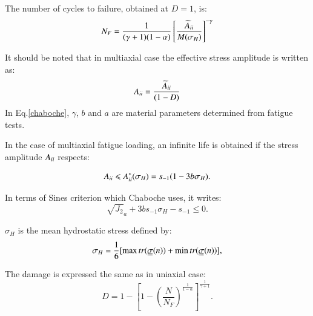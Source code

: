 \documentclass[3p,times,procedia,number]{elsarticle}
\begin{document}
The number of cycles to failure, obtained at $D=1$, is: 
\begin{equation}N_F = \frac{1}{(\gamma+1)(1-\alpha)}\left[\frac{\widetilde{A}_{\uppercase\expandafter{\romannumeral2}}}{M(\sigma_H)}\right]^{-\gamma}
\label{chaboche}
\end{equation} 

It should be noted that in multiaxial case the effective stress amplitude is written as:
$$A_{\uppercase\expandafter{\romannumeral2}}=\frac{\widetilde{A}_{\uppercase\expandafter{\romannumeral2}}}{(1-D)}$$
In Eq.\eqref{chaboche}, $\gamma$, $b$ and $a$ are material parameters determined from fatigue tests.

In the case of multiaxial fatigue loading, an infinite life is obtained if the stress amplitude $A_{\uppercase\expandafter{\romannumeral2}}$ respects:

\begin{equation}A_{\uppercase\expandafter{\romannumeral2}}\leqslant A_{\uppercase\expandafter{\romannumeral2}}^\ast(\sigma_H)=s_{-1}(1-3b\sigma_H).\end{equation}

In terms of Sines criterion which Chaboche uses, it writes:
\begin{equation}\sqrt{J_2}_a+3bs_{-1}\sigma_H-s_{-1}\leqslant 0.
\label{sines}
\end{equation}

$\sigma_H$ is the mean hydrostatic stress defined by:
\begin{equation}\sigma_H=\frac{1}{6}[\max tr(\uuline{\sigma}(n))+\min tr(\uuline{\sigma}(n))],\end{equation}


The damage is expressed the same as in uniaxial case:
\begin{equation}D=1-\left[ 1-\left( \frac{N}{N_F}\right) ^{\frac{1}{1-\alpha}}\right] ^{\frac{1}{\gamma+1}}.
\label{damage}
\end{equation}
\end{document}
